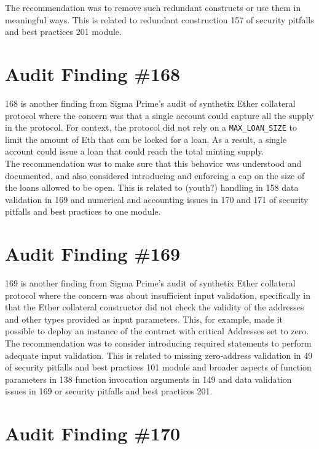 The recommendation was to remove such redundant constructs or use them in meaningful ways. This is related to redundant construction 157 of security pitfalls and best practices 201 module.

\section{Audit Finding \#168}

168 is another finding from Sigma Prime's audit of synthetix Ether collateral protocol where the concern was that a single account could capture all the supply in the protocol. For context, the protocol did not rely on a \verb|MAX_LOAN_SIZE| to limit the amount of Eth that can be locked for a loan. As a result, a single account could issue a loan that could reach the total minting supply.\\

The recommendation was to make sure that this behavior was understood and documented, and also considered introducing and enforcing a cap on the size of the loans allowed to be open. This is related to (youth?) handling in 158 data validation in 169 and numerical and accounting issues in 170 and 171 of security pitfalls and best practices to one module.

\section{Audit Finding \#169}

169 is another finding from Sigma Prime's audit of synthetix Ether collateral protocol where the concern was about insufficient input validation, specifically in that the Ether collateral constructor did not check the validity of the addresses and other types provided as input parameters. This, for example, made it possible to deploy an instance of the contract with critical Addresses set to zero.\\

The recommendation was to consider introducing required statements to perform adequate input validation. This is related to missing zero-address validation in 49 of security pitfalls and best practices 101 module and broader aspects of function parameters in 138 function invocation arguments in 149 and data validation issues in 169 or security pitfalls and best practices 201.

\section{Audit Finding \#170}

